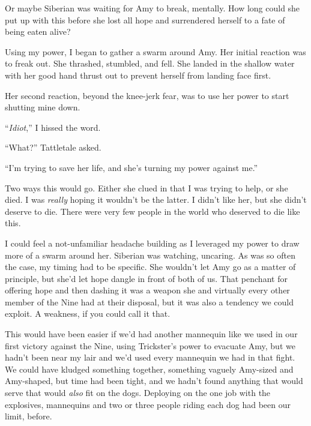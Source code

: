 Or maybe Siberian was waiting for Amy to break, mentally.  How long could she put up with this before she lost all hope and surrendered herself to a fate of being eaten alive?



Using my power, I began to gather a swarm around Amy.  Her initial reaction was to freak out.  She thrashed, stumbled, and fell.  She landed in the shallow water with her good hand thrust out to prevent herself from landing face first.



Her second reaction, beyond the knee-jerk fear, was to use her power to start shutting mine down.



``\emph{Idiot},'' I hissed the word.



``What?''  Tattletale asked.



``I'm trying to save her life, and she's turning my power against me.''



Two ways this would go.  Either she clued in that I was trying to help, or she died.  I was \emph{really} hoping it wouldn't be the latter.  I didn't like her, but she didn't deserve to die.  There were very few people in the world who deserved to die like this.



I could feel a not-unfamiliar headache building as I leveraged my power to draw more of a swarm around her.  Siberian was watching, uncaring.  As was so often the case, my timing had to be specific.  She wouldn't let Amy go as a matter of principle, but she'd let hope dangle in front of both of us.  That penchant for offering hope and then dashing it was a weapon she and virtually every other member of the Nine had at their disposal, but it was also a tendency we could exploit.  A weakness, if you could call it that.



This would have been easier if we'd had another mannequin like we used in our first victory against the Nine, using Trickster's power to evacuate Amy, but we hadn't been near my lair and we'd used every mannequin we had in that fight.  We could have kludged something together, something vaguely Amy-sized and Amy-shaped, but time had been tight, and we hadn't found anything that would serve that would \emph{also} fit on the dogs.  Deploying on the one job with the explosives, mannequins and two or three people riding each dog had been our limit, before.



